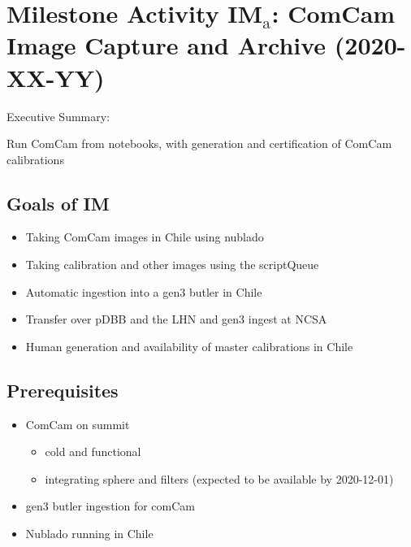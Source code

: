 \section{Milestone Activity IM\(_{\text{a}}\): ComCam Image Capture and Archive    (2020-XX-YY)}
\label{sec:org02d3d25}

Executive Summary:

Run ComCam from notebooks, with generation and certification of ComCam calibrations

\subsection{Goals of IM}
\label{sec:orgbea7b56}
\begin{itemize}
\item Taking ComCam images in Chile using nublado
\item Taking calibration and other images using the scriptQueue
\item Automatic ingestion into a gen3 butler in Chile
\item Transfer over \gls{pDBB} and the \gls{LHN} and gen3 ingest at NCSA
\item Human generation and availability of master calibrations in Chile
\end{itemize}

\subsection{Prerequisites}
\begin{itemize}
\item{ComCam on summit}
\begin{itemize}
\item cold and functional
\item integrating sphere and filters (expected to be available by 2020-12-01)
\end{itemize}
\item{gen3 butler ingestion for comCam}
\item{Nublado running in Chile}
\end{itemize}

